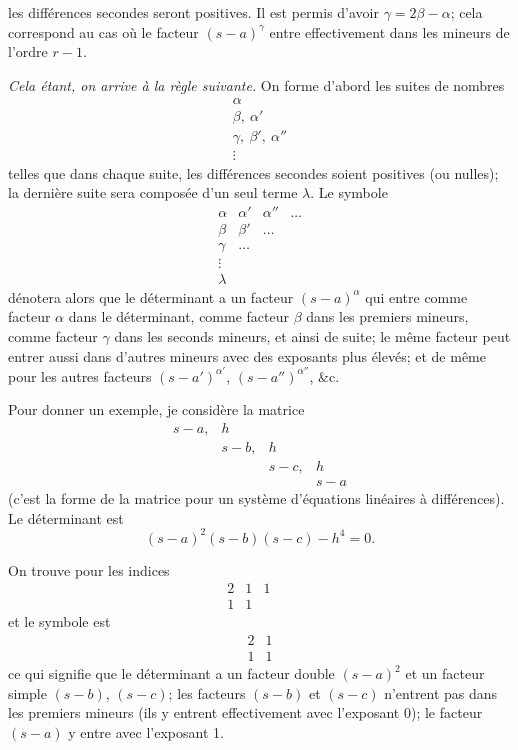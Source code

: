 \documentclass[12pt,a4paper]{article}
\begin{document}
\newpage
\setcounter{page}{217}

les diff\'{e}rences secondes seront positives. Il est permis d'avoir $\gamma = 2\beta - \alpha$; cela correspond au cas o\`{u} le facteur $(s-a)^{\gamma}$ entre effectivement dans les mineurs de l'ordre $r-1$.

\textit{Cela \'{e}tant, on arrive \`{a} la r\`{e}gle suivante.} On forme d'abord les suites de nombres
\[
\begin{array}{c}
\alpha \\
\beta,\ \alpha' \\
\gamma,\ \beta',\ \alpha'' \\
\vdots
\end{array}
\]
telles que dans chaque suite, les diff\'{e}rences secondes soient positives (ou nulles); la derni\`{e}re suite sera compos\'{e}e d'un seul terme $\lambda$. Le symbole
\[
\begin{array}{cccc}
\alpha & \alpha' & \alpha'' & \ldots \\
\beta & \beta' & \ldots & \\
\gamma & \ldots & & \\
\vdots & & & \\
\lambda & & &
\end{array}
\]
d\'{e}notera alors que le d\'{e}terminant a un facteur $(s-a)^{\alpha}$ qui entre comme facteur $\alpha$ dans le d\'{e}terminant, comme facteur $\beta$ dans les premiers mineurs, comme facteur $\gamma$ dans les seconds mineurs, et ainsi de suite; le m\^{e}me facteur peut entrer aussi dans d'autres mineurs avec des exposants plus \'{e}lev\'{e}s; et de m\^{e}me pour les autres facteurs $(s-a')^{\alpha'}$, $(s-a'')^{\alpha''}$, \&c.

Pour donner un exemple, je consid\`{e}re la matrice
\[
\begin{matrix}
s-a, & h & & \\
& s-b, & h & \\
& & s-c, & h \\
& & & s-a
\end{matrix}
\]
(c'est la forme de la matrice pour un syst\`{e}me d'\'{e}quations lin\'{e}aires \`{a} diff\'{e}rences). Le d\'{e}terminant est
\[
(s-a)^2(s-b)(s-c) - h^4 = 0.
\]

\newpage
\setcounter{page}{218}

On trouve pour les indices
\[
\begin{array}{ccccc}
2 & 1 & 1 & & \\
1 & 1 & & &
\end{array}
\]
et le symbole est
\[
\begin{array}{cc}
2 & 1 \\
1 & 1
\end{array}
\]
ce qui signifie que le d\'{e}terminant a un facteur double $(s-a)^2$ et un facteur simple $(s-b)$, $(s-c)$; les facteurs $(s-b)$ et $(s-c)$ n'entrent pas dans les premiers mineurs (ils y entrent effectivement avec l'exposant 0); le facteur $(s-a)$ y entre avec l'exposant 1.
\end{document}
